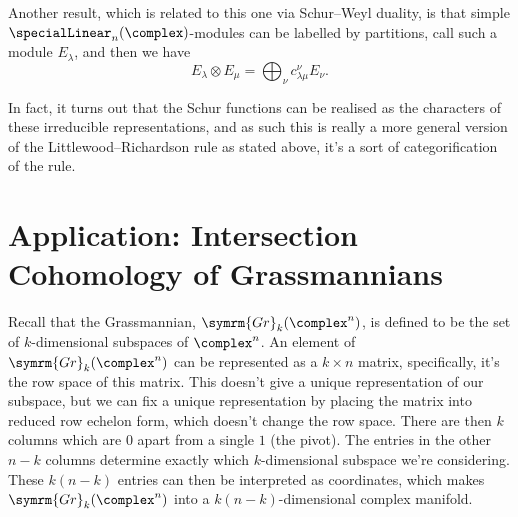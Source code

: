 \documentclass[fleqn]{NotesClass}
\newcommand{\Gr}{\symrm{Gr}}
\begin{document}
    Another result, which is related to this one via Schur--Weyl duality, is that simple \(\specialLinear_n(\complex)\)-modules can be labelled by partitions, call such a module \(E_\lambda\), and then we have
    \begin{equation}
        E_\lambda \otimes E_\mu = \bigoplus_{\nu} c^\nu_{\lambda\mu}E_\nu.
    \end{equation}
    
    In fact, it turns out that the Schur functions can be realised as the characters of these irreducible representations, and as such this is really a more general version of the Littlewood--Richardson rule as stated above, it's a sort of categorification of the rule.
    
    \section{Application: Intersection Cohomology of Grassmannians}
    Recall that the Grassmannian, \(\Gr_k(\complex^n)\), is defined to be the set of \(k\)-dimensional subspaces of \(\complex^n\).
    An element of \(\Gr_k(\complex^n)\) can be represented as a \(k \times n\) matrix, specifically, it's the row space of this matrix.
    This doesn't give a unique representation of our subspace, but we can fix a unique representation by placing the matrix into reduced row echelon form, which doesn't change the row space.
    There are then \(k\) columns which are \(0\) apart from a single \(1\) (the pivot).
    The entries in the other \(n - k\) columns determine exactly which \(k\)-dimensional subspace we're considering.
    These \(k(n-k)\) entries can then be interpreted as coordinates, which makes \(\Gr_k(\complex^n)\) into a \(k(n - k)\)-dimensional complex manifold.
    
\end{document}
